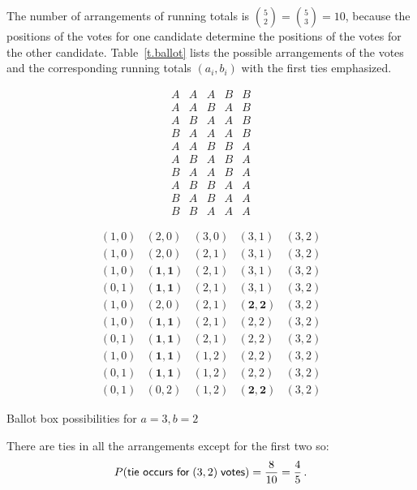 The number of arrangements of running totals is ${5\choose 2}={5\choose 3}=10$, because the positions of the votes for one candidate determine the positions of the votes for the other candidate. Table~\ref{t.ballot} lists the possible arrangements of the votes and the corresponding running totals $(a_i,b_i)$ with the first ties emphasized.
\begin{table}[tb]
\begin{center}
\begin{minipage}{.48\textwidth}
\[
\begin{array}{ccccc}
A & A & A & B & B\\
A & A & B & A & B\\
A & B & A & A & B\\
B & A & A & A & B\\%
A & A & B & B & A\\
A & B & A & B & A\\
B & A & A & B & A\\%
A & B & B & A & A\\
B & A & B & A & A\\%
B & B & A & A & A
\end{array}
\]
\end{minipage}
\hspace{-4em}
\begin{minipage}{.48\textwidth}
\[
\begin{array}{rrrrr}
(1,0) & (2,0) & (3,0) & (3,1) & (3,2)\\
(1,0) & (2,0) & (2,1) & (3,1) & (3,2)\\
(1,0) & \mathbf{(1,1)} & (2,1) & (3,1) & (3,2)\\
(0,1) & \mathbf{(1,1)} & (2,1) & (3,1) & (3,2)\\%
(1,0) & (2,0) & (2,1) & \mathbf{(2,2)} & (3,2)\\
(1,0) & \mathbf{(1,1)} & (2,1) & (2,2) & (3,2)\\
(0,1) & \mathbf{(1,1)} & (2,1) & (2,2) & (3,2)\\%
(1,0) & \mathbf{(1,1)} & (1,2) & (2,2) & (3,2)\\
(0,1) & \mathbf{(1,1)} & (1,2) & (2,2) & (3,2)\\%
(0,1) & (0,2) & (1,2) &  \mathbf{(2,2)} & (3,2)
\end{array}
\]
\end{minipage}
\end{center}
\caption{Ballot box possibilities for $a=3,b=2$}\label{t.ballot}
\end{table}
There are ties in all the arrangements except for the first two so:
\[
P(\textsf{tie occurs for}\;(3,2)\;\textsf{votes})=\displaystyle\frac{8}{10}=\displaystyle\frac{4}{5}\,.
\]


